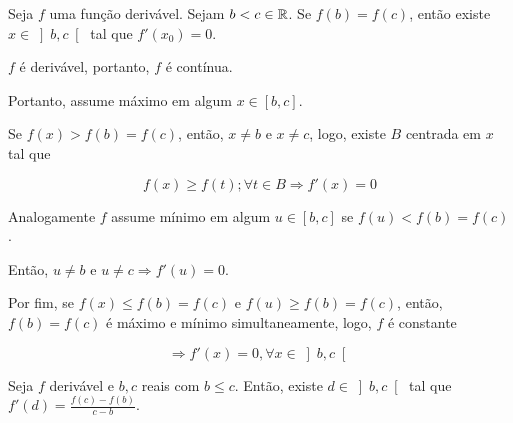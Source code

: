 \documentclass{book}
\begin{document}
\begin{teo}
\label{tr}
\begin{sloppypar}
Seja $f$ uma fun\c c\~ao deriv\'avel. Sejam ${b < c \in \mathbb{R}}$. Se $f\left( b \right) = f\left( c \right)$, ent\~ao existe $x \in \left] {b,c} \right[$ tal que $f'\left( {x_0 } \right) = 0$.
\end{sloppypar}
\end{teo}

\begin{dem}
$f$ \'e deriv\'avel, portanto, $f$ \'e cont\'inua.

Portanto, assume m\'aximo em algum $x \in \left[ {b,c} \right]$.

    Se $f\left( x \right) > f\left( b \right) = f\left( c \right)$, ent\~ao, $x \ne b$ e $x \ne c$, logo, existe $B$ centrada em $x$ tal que

\[
    f\left( x \right) \geqslant f\left( t \right);\forall t \in B \Rightarrow f'\left( x \right) = 0
\]

    Analogamente $f$ assume m\'inimo em algum $u \in \left[ {b,c} \right]$ se $f\left( u \right) < f\left( b \right) = f\left( c \right)$.

Ent\~ao, $u \ne b$ e $u \ne c \Rightarrow f'\left( u \right) = 0$.

    Por fim, se $f\left( x \right) \leqslant f\left( b \right) = f\left( c \right)$ e $f\left( u \right) \geqslant f\left( b \right) = f\left( c \right)$, ent\~ao, $f\left( b \right) = f\left( c \right)$ \'e m\'aximo e m\'inimo simultaneamente, logo, $f$ \'e constante

\[
\Rightarrow f'\left( x \right) = 0,\forall x \in \left] {b,c} \right[
\]

\end{dem}

\newpage 

\begin{teo}
\label{tvm}
Seja $f$ deriv\'avel e $b,c$ reais com $b \leqslant c$. Ent\~ao, existe $d \in \left] {b,c} \right[$ tal que $\displaystyle f'\left( d \right) = \frac{{f\left( c \right) - f\left( b \right)}}{{c - b}}$.
\end{teo}
\end{document}
